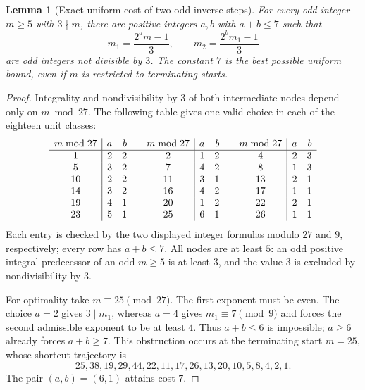 \documentclass[11pt,a4paper]{article}
\newtheorem{lemma}[theorem]{Lemma}
\theoremstyle{definition}
\theoremstyle{remark}
\numberwithin{equation}{section}
\begin{document}
\begin{lemma}[Exact uniform cost of two odd inverse steps]
\label{D:lem:inverse-pair-cost}
For every odd integer $m\ge5$ with $3\nmid m$, there are positive
integers $a,b$ with $a+b\le7$ such that
\[
 m_1=\frac{2^a m-1}{3},\qquad
 m_2=\frac{2^b m_1-1}{3}
\]
are odd integers not divisible by $3$.  The constant $7$ is the best
possible uniform bound, even if $m$ is restricted to terminating starts.
\end{lemma}
\begin{proof}
Integrality and nondivisibility by $3$ of both intermediate nodes depend
only on $m\bmod27$.  The following table gives one valid choice in each
of the eighteen unit classes:
\[
\begin{array}{c|rr@{\qquad}c|rr@{\qquad}c|rr}
 m\bmod27&a&b&m\bmod27&a&b&m\bmod27&a&b\\\hline
 1&2&2& 2&1&2& 4&2&3\\
 5&3&2& 7&4&2& 8&1&3\\
 10&2&2&11&3&1&13&2&1\\
 14&3&2&16&4&2&17&1&1\\
 19&4&1&20&1&2&22&2&1\\
 23&5&1&25&6&1&26&1&1
\end{array}
\]
Each entry is checked by the two displayed integer formulas modulo $27$
and $9$, respectively; every row has $a+b\le7$.  All nodes are at least
$5$: an odd positive integral predecessor of an odd $m\ge5$ is at least
$3$, and the value $3$ is excluded by nondivisibility by $3$.

For optimality take $m\equiv25\pmod{27}$.  The first exponent must
be even.  The choice $a=2$ gives $3\mid m_1$, whereas $a=4$ gives
$m_1\equiv7\pmod9$ and forces the second admissible exponent to
be at least $4$.  Thus $a+b\le6$ is impossible; $a\ge6$ already
forces $a+b\ge7$.  This obstruction occurs at the terminating start
$m=25$, whose shortcut trajectory is
\[
25,38,19,29,44,22,11,17,26,13,20,10,5,8,4,2,1.
\]
The pair $(a,b)=(6,1)$ attains cost $7$.
\end{proof}
\end{document}
